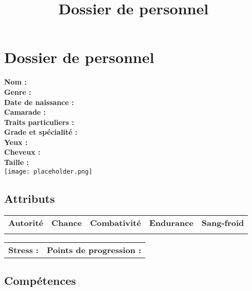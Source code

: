 \documentclass{report}
\title{Dossier de personnel}
\author{}
\date{}
\begin{document}
\ttfamily

\section*{Dossier de personnel}



\begin{multicols}{3}
\noindent\textbf{Nom :}\\
\textbf{Genre :}\\\textbf{Date de naissance :}\\
\textbf{Camarade :}\\
\textbf{Traits particuliers :}\\
\columnbreak
\textbf{Grade et spécialité :} \\
\textbf{Yeux :}\\
\textbf{Cheveux :}\\
\textbf{Taille :}\\
\columnbreak
\texttt{[image: placeholder.png]}
\end{multicols}
\noindent\makebox[\linewidth]{\rule{\textwidth}{0.4pt}}


\subsection*{Attributs}
\begin{center}
    \begin{tabular}{c|c|c|c|c}
        \textbf{Autorité} & \textbf{Chance} & \textbf{Combativité} & \textbf{Endurance} & \textbf{Sang-froid} \\
         & & & &\\

    \end{tabular}
\end{center}

\begin{tabular}{m{} m{}}
     \textbf{Stress :} & \textbf{Points de progression :}
\end{tabular}

\noindent\makebox[\linewidth]{\rule{\textwidth}{0.4pt}}
\subsection*{Compétences}
\end{document}
